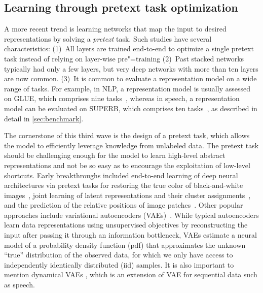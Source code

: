 \subsection{Learning through pretext task optimization}

A more recent trend is learning networks that map the input to desired
representations by solving a \textit{pretext} task. Such studies have several
characteristics:
(1)~All layers are trained end-to-end to optimize a single pretext task instead
of relying on layer-wise pre"=training
(2)~Past stacked networks typically had only a few layers, but 
very deep networks with more than ten layers are now common.
(3)~It is common to evaluate a representation model on a wide range of tasks.
For example, in NLP, a representation model is usually assessed on GLUE,
which comprises nine tasks~\parencite{wang_glue_2018}, whereas in speech, a representation model can be
evaluated on SUPERB, which comprises ten tasks~\parencite{yang_superb_2021}, 
as described in detail in \cref{sec:benchmark}.

The cornerstone of this third wave is the design of a pretext task, which
allows the model to efficiently leverage knowledge from unlabeled data.
The pretext task should be challenging enough for the model to learn high-level
abstract representations and 
  not be so easy as to encourage the exploitation of low-level shortcuts.  %
Early breakthroughs included end-to-end learning of deep neural architectures
via pretext tasks for restoring the true color of black-and-white
images~\parencite{zhang_colorful_2016}, joint learning of latent representations and their
cluster assignments~\parencite{caron_deep_2018}, and the prediction of the relative positions of
image patches~\parencite{doersch_unsupervised_2015}. Other popular approaches include variational
autoencoders (VAEs)~\parencite{kingma_autoencoding_2014, rezende_stochastic_2014}. While typical autoencoders learn data
representations using unsupervised objectives by reconstructing the input
after passing it through an information bottleneck, VAEs estimate a neural model of a probability density function (pdf) that approximates the unknown “true” distribution of the observed data, for which we only have access to independently identically distributed (iid) samples. It is also important to mention dynamical VAEs \parencite{girin_dynamical_2021}, which is an extension of VAE for sequential data such as speech.

